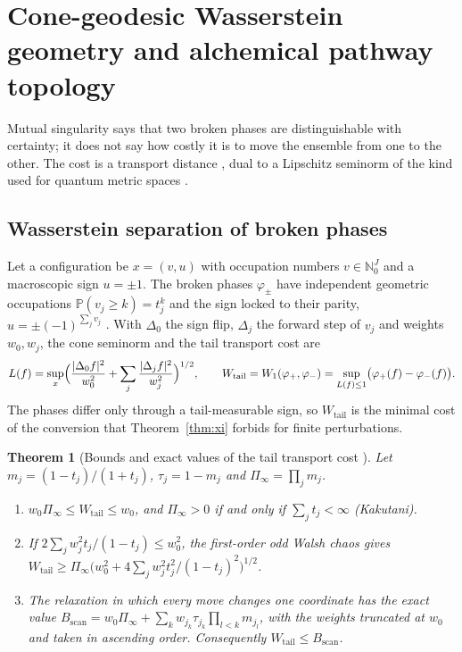 \documentclass[11pt,reqno]{amsart}
\theoremstyle{plain}
\newtheorem{theorem}{Theorem}[section]
\theoremstyle{definition}
\theoremstyle{remark}
\numberwithin{equation}{section}
\newcommand{\PP}{\mathbb{P}}
\newcommand{\N}{\mathbb{N}}
\newcommand{\Wtail}{W_{\mathrm{tail}}}
\begin{document}
\section{Cone-geodesic Wasserstein geometry and alchemical pathway topology}
\label{sec:wasserstein}

Mutual singularity says that two broken phases are distinguishable with certainty; it does not say how costly it is to move the ensemble from one to the other. The cost is a transport distance \cite{KantorovichRubinstein1958,Villani2009}, dual to a Lipschitz seminorm of the kind used for quantum metric spaces \cite{Connes1989,Rieffel1999}.

\subsection*{Wasserstein separation of broken phases}
Let a configuration be $x=(v,u)$ with occupation numbers $v\in\N_0^J$ and a macroscopic sign $u=\pm1$. The broken phases $\varphi_\pm$ have independent geometric occupations $\PP(v_j\ge k)=t_j^k$ and the sign locked to their parity, $u=\pm(-1)^{\sum_jv_j}$ \cite{ChenChen2026VI}. With $\Delta_0$ the sign flip, $\Delta_j$ the forward step of $v_j$ and weights $w_0,w_j$, the cone seminorm and the tail transport cost are
\begin{equation}\label{eq:wtail}
L(f)=\sup_x\Bigl(\frac{|\Delta_0f|^2}{w_0^2}+\sum_j\frac{|\Delta_jf|^2}{w_j^2}\Bigr)^{1/2},\qquad \Wtail=W_1(\varphi_+,\varphi_-)=\sup_{L(f)\le1}\bigl(\varphi_+(f)-\varphi_-(f)\bigr).
\end{equation}
The phases differ only through a tail-measurable sign, so $\Wtail$ is the minimal cost of the conversion that Theorem~\ref{thm:xi} forbids for finite perturbations.

\begin{theorem}[Bounds and exact values of the tail transport cost \cite{ChenChen2026VI}]\label{thm:wtail}
Let $m_j=(1-t_j)/(1+t_j)$, $\tau_j=1-m_j$ and $\Pi_\infty=\prod_jm_j$.
\begin{enumerate}[label=\textup{(\arabic*)},leftmargin=*]
\item $w_0\Pi_\infty\le\Wtail\le w_0$, and $\Pi_\infty>0$ if and only if $\sum_jt_j<\infty$ (Kakutani).
\item If $2\sum_jw_j^2t_j/(1-t_j)\le w_0^2$, the first-order odd Walsh chaos gives $\Wtail\ge\Pi_\infty\bigl(w_0^2+4\sum_jw_j^2t_j^2/(1-t_j)^2\bigr)^{1/2}$.
\item The relaxation in which every move changes one coordinate has the exact value $B_{\mathrm{scan}}=w_0\Pi_\infty+\sum_kw_{j_k}\tau_{j_k}\prod_{l<k}m_{j_l}$, with the weights truncated at $w_0$ and taken in ascending order. Consequently $\Wtail\le B_{\mathrm{scan}}$.
\end{enumerate}
\end{theorem}
\end{document}
